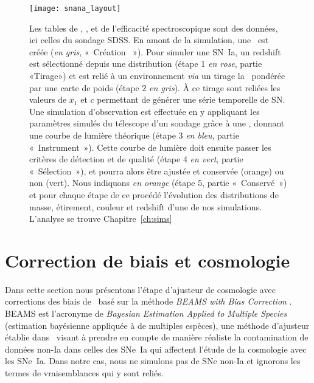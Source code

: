 \documentclass[../main/main.tex]{subfiles}
\begin{document}
\begin{figure}[p]
    \vspace*{-3.2cm}
    \centerfloat
    \texttt{[image: snana\_layout]}
    \caption[Schéma de fonctionnement d'une simulation avec
    \snana]{\footnotesize Les tables de \wgtmap, \simlib, et de l'efficacité
        spectroscopique sont des données, ici celles du sondage SDSS. En amont
        de la simulation, une \hostlib\ est créée (\textit{en gris}, «~Création
        \hostlib~»). Pour simuler une SN~Ia, un redshift est sélectionné depuis
        une distribution (étape 1 \textit{en rose}, partie «Tirage») et est
        relié à un environnement \textit{via} un tirage la \hostlib\ pondérée
        par une carte de poids (étape 2 \textit{en gris}). À ce tirage sont
        reliées les valeurs de $x_1$ et $c$ permettant de générer une série
        temporelle de SN. Une simulation d'observation est effectuée en y
        appliquant les paramètres simulés du télescope d'un sondage grâce à une
        \simlib, donnant une courbe de lumière théorique (étape 3 \textit{en
        bleu}, partie «~Instrument~»). Cette courbe de lumière doit ensuite
        passer les critères de détection et de qualité (étape 4 \textit{en
        vert}, partie «~Sélection~»), et pourra alors être ajustée et conservée
        (orange) ou non (vert). Nous indiquons \textit{en orange} (étape 5,
        partie «~Conservé~») et pour chaque étape de ce procédé l'évolution des
        distributions de masse, étirement, couleur et redshift d'une de nos
    simulations. L'analyse se trouve Chapitre~\ref{ch:sims}}
    \label{fig:snana_func}
\end{figure}

\section{Correction de biais et cosmologie}\label{sec:biais}

Dans cette section nous présentons l'étape d'ajusteur de cosmologie avec
corrections des biais de \snana\ basé sur la méthode \textit{BEAMS with Bias
Correction} \citep[\bbc,][]{kessler2017}. BEAMS est l'acronyme de
\textit{Bayesian Estimation Applied to Multiple Species} (estimation bayésienne
appliquée à de multiples espèces), une méthode d'ajusteur établie
dans~\cite{kunz2007} visant à prendre en compte de manière réaliste la
contamination de données non-Ia dans celles des SNe~Ia qui affectent l'étude de
la cosmologie avec les SNe~Ia. Dans notre cas, nous ne simulons pas de SNe
non-Ia et ignorons les termes de vraisemblances qui y sont reliés.
\end{document}

